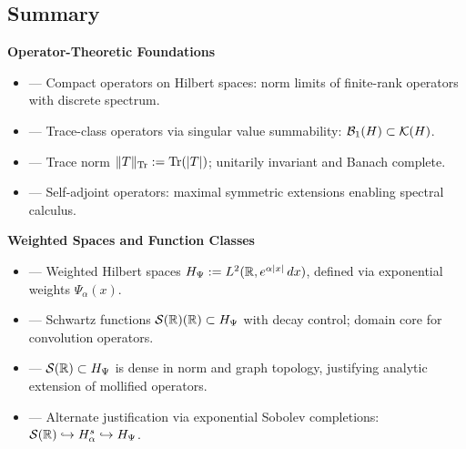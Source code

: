 \subsection*{Summary}
\label{sec:foundations_summary}

\textbf{Operator-Theoretic Foundations}
\begin{itemize}
  \item {} — Compact operators on Hilbert spaces: norm limits of finite-rank operators with discrete spectrum.
  \item {} — Trace-class operators via singular value summability: \( \mathcal{B}_1(H) \subset \mathcal{K}(H) \).
  \item {} — Trace norm \( \|T\|_{\operatorname{Tr}} := \operatorname{Tr}(|T|) \); unitarily invariant and Banach complete.
  \item {} — Self-adjoint operators: maximal symmetric extensions enabling spectral calculus.
\end{itemize}

\textbf{Weighted Spaces and Function Classes}
\begin{itemize}
  \item {} — Weighted Hilbert spaces \( H_{\Psi} := L^2(\mathbb{R}, e^{\alpha|x|}\,dx) \), defined via exponential weights \( \Psi_\alpha(x) \).
  \item {} — Schwartz functions \( \mathcal{S}(\mathbb{R})(\mathbb{R}) \subset H_{\Psi} \) with decay control; domain core for convolution operators.
  \item {} — \( \mathcal{S}(\mathbb{R}) \subset H_{\Psi} \) is dense in norm and graph topology, justifying analytic extension of mollified operators.
  \item {} — Alternate justification via exponential Sobolev completions: \( \mathcal{S}(\mathbb{R}) \hookrightarrow H^s_\alpha \hookrightarrow H_{\Psi} \).
\end{itemize}

